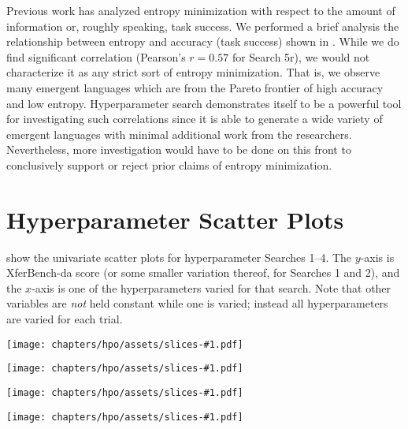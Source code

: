 Previous work \citep{kharitonov2020entmin,chaabouni2021color} has analyzed entropy minimization with respect to the amount of information or, roughly speaking, task success.
We performed a brief analysis the relationship between entropy and accuracy (task success) shown in .
While we do find significant correlation (Pearson's $r=0.57$ for Search 5r), we would not characterize it as any strict sort of entropy minimization.
That is, we observe many emergent languages which are from the Pareto frontier of high accuracy and low entropy.
Hyperparameter search demonstrates itself to be a powerful tool for investigating such correlations since it is able to generate a wide variety of emergent languages with minimal additional work from the researchers.
Nevertheless, more investigation would have to be done on this front to conclusively support or reject prior claims of entropy minimization.




\section{Hyperparameter Scatter Plots}
\unskip\label{hpo:sec:hp-scatter}

 show the univariate scatter plots for hyperparameter Searches 1--4.
The $y$-axis is XferBench-da score (or some smaller variation thereof, for Searches 1 and 2), and the $x$-axis is one of the hyperparameters varied for that search.
Note that other variables are \emph{not} held constant while one is varied; instead all hyperparameters are varied for each trial.

\newcommand\slicefig[2]{%
\begin{figure*}
  \centering
  \texttt{[image: chapters/hpo/assets/slices-\#1.pdf]}
  \caption{#2}
  \unskip\label{hpo:fig:slice-#1}
\end{figure*}
}
\slicefig{0}{Objective values for Search 1 by individual hyperparameter.}
\slicefig{1}{Objective values for Search 2 by individual hyperparameter.}
\slicefig{2}{Objective values for Search 3 by individual hyperparameter.}
\slicefig{3}{Objective values for Search 4 by individual hyperparameter.}

